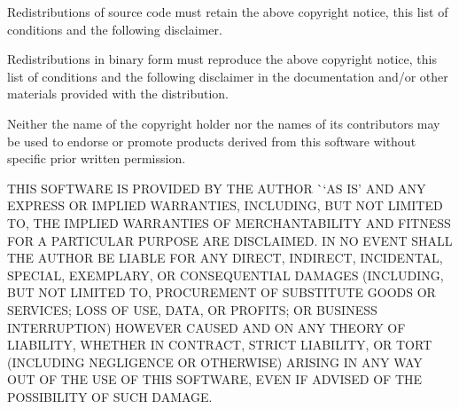 \begin{DoxyEnumerate}
\item Redistributions of source code must retain the above copyright notice, this list of conditions and the following disclaimer.
\item Redistributions in binary form must reproduce the above copyright notice, this list of conditions and the following disclaimer in the documentation and/or other materials provided with the distribution.
\item Neither the name of the copyright holder nor the names of its contributors may be used to endorse or promote products derived from this software without specific prior written permission.
\end{DoxyEnumerate}

THIS SOFTWARE IS PROVIDED BY THE AUTHOR \`{}`AS IS'\textquotesingle{} AND ANY EXPRESS OR IMPLIED WARRANTIES, INCLUDING, BUT NOT LIMITED TO, THE IMPLIED WARRANTIES OF MERCHANTABILITY AND FITNESS FOR A PARTICULAR PURPOSE ARE DISCLAIMED. IN NO EVENT SHALL THE AUTHOR BE LIABLE FOR ANY DIRECT, INDIRECT, INCIDENTAL, SPECIAL, EXEMPLARY, OR CONSEQUENTIAL DAMAGES (INCLUDING, BUT NOT LIMITED TO, PROCUREMENT OF SUBSTITUTE GOODS OR SERVICES; LOSS OF USE, DATA, OR PROFITS; OR BUSINESS INTERRUPTION) HOWEVER CAUSED AND ON ANY THEORY OF LIABILITY, WHETHER IN CONTRACT, STRICT LIABILITY, OR TORT (INCLUDING NEGLIGENCE OR OTHERWISE) ARISING IN ANY WAY OUT OF THE USE OF THIS SOFTWARE, EVEN IF ADVISED OF THE POSSIBILITY OF SUCH DAMAGE. 